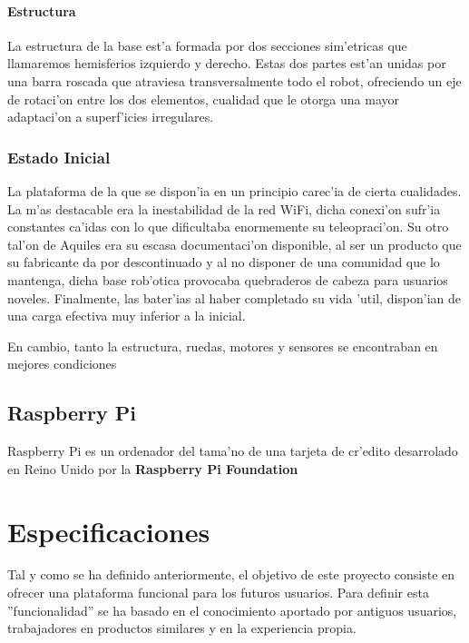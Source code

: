 \documentclass[twoside]{article}
\begin{document}
\paragraph{Estructura}\noindent

La estructura de la base est'a formada por dos secciones sim'etricas que llamaremos hemisferios izquierdo y derecho. Estas dos partes est'an unidas por una barra roscada que atraviesa transversalmente todo el robot, ofreciendo un eje de rotaci'on entre los dos elementos, cualidad que le otorga una mayor adaptaci'on a superf'icies irregulares.

\subsubsection{Estado Inicial}  
La plataforma de la que se dispon'ia en un principio carec'ia de cierta cualidades. La m'as destacable era la inestabilidad de la red WiFi, dicha conexi'on sufr'ia constantes ca'idas con lo que dificultaba enormemente su teleopraci'on. Su otro tal'on de Aquiles era su escasa documentaci'on disponible, al ser un producto que su fabricante da por descontinuado y al no disponer de una comunidad que lo mantenga, dicha base rob'otica provocaba quebraderos de cabeza para usuarios noveles. Finalmente, las bater'ias al haber completado su vida 'util, dispon'ian de una carga efectiva muy inferior a la inicial. 

En cambio, tanto la estructura, ruedas, motores y sensores se encontraban en mejores condiciones

\subsection{Raspberry Pi}
Raspberry Pi es un ordenador del tama'no de una tarjeta de cr'edito desarrolado en Reino Unido por la \textbf{Raspberry Pi Foundation}
\newpage

\section{Especificaciones}
Tal y como se ha definido anteriormente, el objetivo de este proyecto consiste en ofrecer una plataforma funcional para los futuros usuarios. Para definir esta ''funcionalidad'' se ha basado en el conocimiento aportado por antiguos usuarios, trabajadores en productos similares y en la experiencia propia. 
\end{document}
